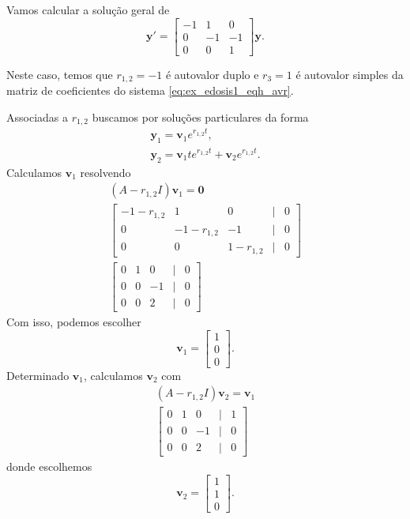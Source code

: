 \begin{ex}
  Vamos calcular a solução geral de
  \begin{equation}\label{eq:ex_edosis1_eqh_avr}
    \pmb{y}' =
    \begin{bmatrix}
      -1 & 1 & 0 \\
      0 & -1 & -1 \\
      0 & 0 & 1
    \end{bmatrix}
    \pmb{y}.
  \end{equation}

  Neste caso, temos que $r_{1,2} = -1$ é autovalor duplo e $r_3=1$ é autovalor simples da matriz de coeficientes do sistema \eqref{eq:ex_edosis1_eqh_avr}.
  
  Associadas a $r_{1,2}$ buscamos por soluções particulares da forma
  \begin{align}
    \pmb{y}_1 = \pmb{v}_1e^{r_{1,2}t}, \\
    \pmb{y}_2 = \pmb{v}_1te^{r_{1,2}t} + \pmb{v}_2e^{r_{1,2}t}.
  \end{align}
  Calculamos $\pmb{v}_1$ resolvendo
  \begin{gather}
    (A - r_{1,2}I)\pmb{v}_1 = \pmb{0} \\
    \begin{bmatrix}
      -1-r_{1,2} & 1 & 0 & | & 0 \\
      0 & -1-r_{1,2} & -1 & | & 0 \\
      0 & 0 & 1-r_{1,2} & | & 0
    \end{bmatrix}\\
    \begin{bmatrix}
      0 & 1 & 0 & | & 0 \\
      0 & 0 & -1 & | & 0 \\
      0 & 0 &  2 & | & 0
    \end{bmatrix}
  \end{gather}
  Com isso, podemos escolher
  \begin{equation}
    \pmb{v}_1 =
    \begin{bmatrix}
      1 \\
      0 \\
      0
    \end{bmatrix}.
  \end{equation}
  Determinado $\pmb{v}_1$, calculamos $\pmb{v}_2$ com
  \begin{gather}
    (A-r_{1,2}I)\pmb{v}_2 = \pmb{v}_1 \\
    \begin{bmatrix}
      0 & 1 & 0 & | & 1 \\
      0 & 0 & -1 & | & 0 \\
      0 & 0 & 2 & | & 0
    \end{bmatrix}
  \end{gather}
  donde escolhemos
  \begin{equation}
    \pmb{v}_2 =
    \begin{bmatrix}
      1 \\
      1 \\
      0
    \end{bmatrix}.
  \end{equation}


\end{ex}

